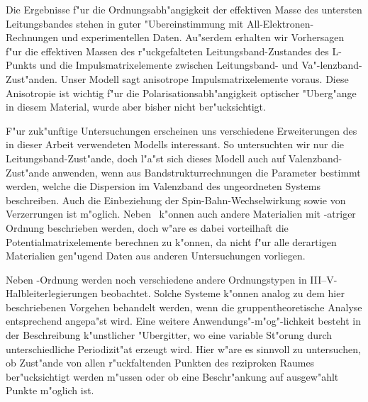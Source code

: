 
Die Ergebnisse f"ur die Ordnungsabh"angigkeit der effektiven Masse des
untersten Leitungsbandes stehen in guter "Ubereinstimmung mit
All-Elektronen-Rechnungen und experimentellen Daten. Au"serdem erhalten wir
Vorhersagen f"ur die effektiven Massen des r"uckgefalteten
Leitungsband-Zustandes des L-Punkts und die Impulsmatrixelemente zwischen
Leitungsband- und Va"-lenzband-Zust"anden. Unser Modell sagt anisotrope
Impulsmatrixelemente voraus. Diese Anisotropie ist wichtig f"ur die
Polarisationsabh"angigkeit optischer "Uberg"ange in diesem Material, wurde aber
bisher nicht ber"ucksichtigt.

F"ur zuk"unftige Untersuchungen erscheinen uns verschiedene Erweiterungen des
in dieser Arbeit verwendeten Modells interessant. So untersuchten wir nur die
Leitungsband-Zust"ande, doch l"a"st sich dieses Modell auch auf
Valenzband-Zust"ande anwenden, wenn aus Bandstrukturrechnungen die Parameter
bestimmt werden, welche die Dispersion im Valenzband des ungeordneten Systems
beschreiben. Auch die Einbeziehung der Spin-Bahn-Wechselwirkung sowie von
Verzerrungen ist m"oglich. Neben \GaInP\ k"onnen auch andere Materialien mit
\CuPt-atriger Ordnung beschrieben werden, doch w"are es dabei vorteilhaft die
Potentialmatrixelemente berechnen zu k"onnen, da nicht f"ur alle derartigen
Materialien gen"ugend Daten aus anderen Untersuchungen vorliegen. 

Neben \CuPt-Ordnung werden noch verschiedene andere Ordnungstypen in
III--V-Halbleiterlegierungen beobachtet. Solche Systeme k"onnen analog zu dem
hier beschriebenen Vorgehen behandelt werden, wenn die gruppentheoretische
Analyse entsprechend angepa"st wird. Eine weitere Anwendungs"-m"og"-lichkeit 
besteht in der Beschreibung k"unstlicher "Ubergitter, wo eine variable
St"orung durch unterschiedliche Periodizit"at erzeugt wird. Hier w"are es
sinnvoll zu untersuchen, ob Zust"ande von allen r"uckfaltenden Punkten des
reziproken Raumes ber"ucksichtigt werden m"ussen oder ob eine Beschr"ankung
auf ausgew"ahlt Punkte m"oglich ist. 




